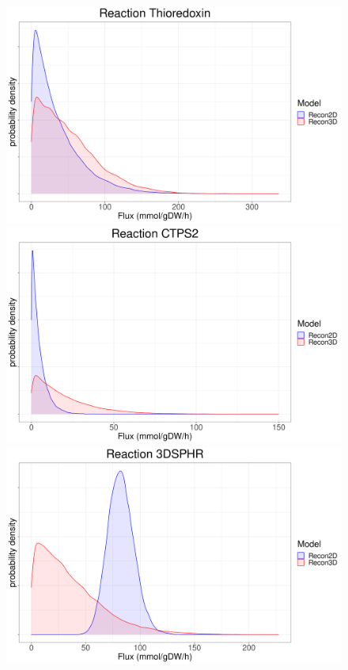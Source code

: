    \begin{figure}[t!]
      \centering
      \includegraphics[scale=0.215]{figures/Thioredoxin}
      \includegraphics[scale=0.215]{figures/CTPS2}\\
      \vspace{0.25cm}
      \includegraphics[scale=0.215]{figures/3DSPHR}

\end{figure}
